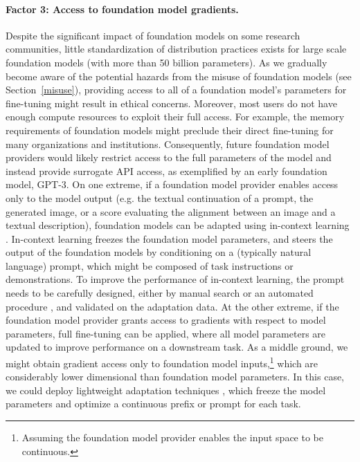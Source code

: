 \paragraph{Factor 3: Access to foundation model gradients.} Despite the significant impact of foundation models on some research communities, little standardization of distribution practices exists for large scale foundation models (with more than 50 billion parameters). As we gradually become aware of the potential hazards from the misuse of foundation models (see Section~\ref{misuse}), providing access to all of a foundation model's parameters for fine-tuning might result in ethical concerns. Moreover, most users do not have enough compute resources to exploit their full access. For example, the memory requirements of foundation models might preclude their direct fine-tuning for many organizations and institutions. Consequently, future foundation model providers would likely restrict access to the full parameters of the model and instead provide surrogate API access, as exemplified by an early foundation model, GPT-3. On one extreme, if a foundation model provider enables access only to the model output (e.g. the textual continuation of a prompt, the generated image, or a score evaluating the alignment between an image and a textual description), foundation models can be adapted using in-context learning \citep{brown2020gpt3}. In-context learning freezes the foundation model parameters, and steers the output of the foundation models by conditioning on a (typically natural language) prompt, which might be composed of task instructions or demonstrations. To improve the performance of in-context learning, the prompt needs to be carefully designed, either by manual search or an automated procedure \citep{jiang-etal-2020-know, shin-etal-2020-autoprompt}, and validated on the adaptation data. At the other extreme, if the foundation model provider grants access to gradients with respect to model parameters, full fine-tuning can be applied, where all model parameters are updated to improve performance on a downstream task. As a middle ground, we might obtain gradient access only to foundation model inputs,\footnote{Assuming the foundation model provider enables the input space to be continuous.} which are considerably lower dimensional than foundation model parameters. In this case, we could deploy lightweight adaptation techniques  \citep{liu2021prompt, li2021prefix,lester2021power}, which freeze the model parameters and optimize a continuous prefix or prompt for each task.

